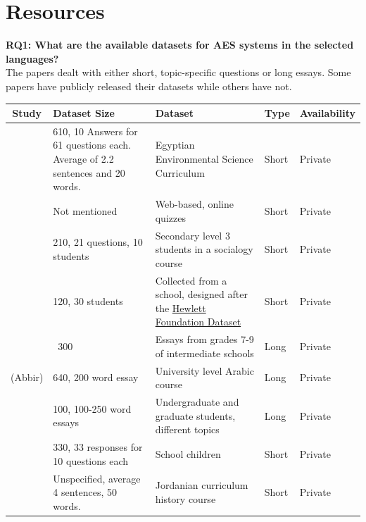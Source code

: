 \documentclass{article}
\begin{document}
\section{Resources}
\textbf{RQ1: What are the available datasets for AES systems in the selected languages?} \\
The papers dealt with either short, topic-specific questions or long essays. Some papers have publicly released their datasets while others have not.
\newpage
{}
\begin{table}[H]
    \centering
    \begin{tabularx}{6in}{|c|X|p{1.5in}|p{1cm}|p{1.5cm}|}
    \hline
        Study & Dataset Size & Dataset & Type & Availability \\ \hline
        \textcite{1_gomaa2014arabic} & 610, 10 Answers for 61 questions each.  Average of 2.2 sentences and 20 words. & Egyptian Environmental Science Curriculum & Short & Private \\ \hline
        \textcite{2_shalabi2016levenshtein} & Not mentioned & Web-based, online quizzes & Short & Private \footnotemark[1] \\ \hline
        \textcite{3_shehab2018arabicsimiliarity} & 210, 21 questions, 10 students & Secondary level 3 students in a socialogy course & Short & Private \\ \hline
        \textcite{4_abdeljaber2021wordnet} & 120, 30 students & Collected from a school, designed after the \href{https://www.kaggle.com/c/asap-aes}{Hewlett Foundation Dataset} & Short & Private \\ \hline
        \textcite{5_aljouie2017schoolchildren} & ~300 & Essays from grades 7-9 of intermediate schools & Long & Private \\ \hline
        \textcite{6_ghamdi2014hybridarabic} (Abbir) & 640, 200 word essay & University level Arabic course & Long & Private \\ \hline
        \textcite{7_qahtani2019rulebased} & 100, 100-250 word essays & Undergraduate and graduate students, different topics & Long & Private \\ \hline
        \textcite{8_abdel2021lcs} & 330, 33 responses for 10 questions each & School children & Short & Private \footnotemark[2] \\ \hline
        \textcite{16_rababah2017short} & Unspecified, average 4 sentences, 50 words. & Jordanian curriculum history course & Short & Private \\ \hline

\end{tabularx}
\end{table}
\end{document}
